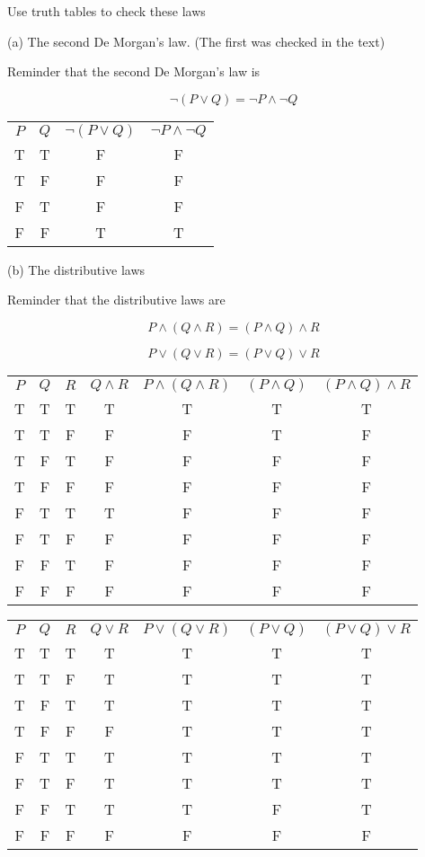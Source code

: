 \documentclass[11pt]{article}
\begin{document}
Use truth tables to check these laws

\noindent (a) The second De Morgan's law. (The first was checked in the text)

Reminder that the second De Morgan's law is 

$$\neg (P \vee Q) = \neg P \wedge \neg Q$$

\begin{center}
\begin{tabular}{ c c c c }
 $P$ & $Q$ & $\neg (P \vee Q)$ & $\neg P \wedge \neg Q$\\ 
T & T & F & F\\  
T & F & F & F\\
F & T & F & F\\  
F & F & T & T
\end{tabular}
\end{center}

\noindent (b) The distributive laws

Reminder that the distributive laws are 

$$P \wedge (Q \wedge R) = (P \wedge Q) \wedge R$$

$$P \vee (Q \vee R) = (P \vee Q) \vee R$$

\begin{center}
\begin{tabular}{ c c c c c c c }
 $P$ & $Q$ & $R$ & $Q \wedge R$ & $P \wedge (Q \wedge R)$ & $(P \wedge Q)$ & $(P \wedge Q) \wedge R$\\ 
T & T & T & T & T & T & T\\  
T & T & F & F & F & T & F\\
T & F & T & F & F & F & F\\  
T & F & F & F & F & F & F\\
F & T & T & T & F & F & F\\  
F & T & F & F & F & F & F\\
F & F & T & F & F & F & F\\  
F & F & F & F & F & F & F
\end{tabular}
\end{center}

\begin{center}
\begin{tabular}{ c c c c c c c }
 $P$ & $Q$ & $R$ & $Q \vee R$ & $P \vee (Q \vee R)$ & $(P \vee Q)$ & $(P \vee Q) \vee R$\\ 
T & T & T & T & T & T & T\\  
T & T & F & T & T & T & T\\
T & F & T & T & T & T & T\\  
T & F & F & F & T & T & T\\
F & T & T & T & T & T & T\\  
F & T & F & T & T & T & T\\
F & F & T & T & T & F & T\\  
F & F & F & F & F & F & F
\end{tabular}
\end{center}
\end{document}
